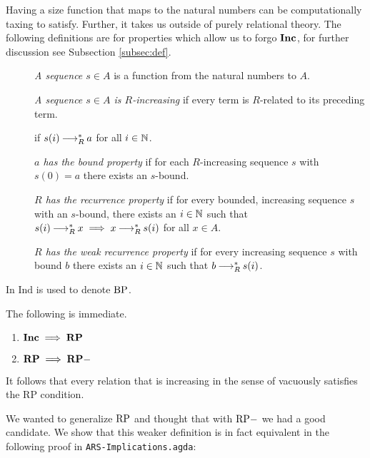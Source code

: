 Having a size function that maps to the natural numbers can be computationally taxing to satisfy.
Further, it takes us outside of purely relational theory. The following definitions are for properties which allow us to forgo $\mathbf{Inc}$, for further discussion see Subsection \ref{subsec:def}.
\begin{definition} \label{def:rp} \hfill
    \begin{description}
        \item[] \emph{A sequence $s \in A$} is a function from the natural numbers to $A$.
        \item[] \emph{A sequence $s \in A$ is $R$-increasing} if every term is $R$-related to its preceding term.
        \item[] if $s (i) \mathbin{\longrightarrow_R^*} a$ for all $i \in \mathbb{N}$.
        \item[] \emph{$a$ has the bound property} if for each $R$-increasing sequence $s$ with $s (0) = a$ there exists an $s$-bound.
        \item[] \emph{$R$ has the recurrence property} if for every bounded, increasing sequence $s$ with an $s$-bound, there exists an $i \in \mathbb{N}$ such that
        $s (i) \mathbin{\longrightarrow_R^*} x \implies x \mathbin{\longrightarrow_R^*} s (i)$ for all $x\in A$. 
        \item[] \emph{$R$ has the weak recurrence property} if for every increasing sequence $s$ with bound $b$ there exists an $i \in \mathbb{N}$ such that $b \mathbin{\longrightarrow_R^*} s (i)$.
    \end{description}
\end{definition}

In \terese $\mathrm{Ind}$ is used to denote $\mathrm{BP}$.

The following is immediate.
\begin{proposition}\hfill
    \begin{enumerate}
        \item $\mathbf{Inc} \implies \mathbf{RP}$
        \item $\mathbf{RP} \implies \mathbf{RP{-}}$
    \end{enumerate}
\end{proposition}


It follows that every relation that is increasing in the sense of \terese
vacuously satisfies the RP condition.

We wanted to generalize $\mathrm{RP}$ and thought that with $\mathrm{RP{-}}$ we had a good candidate.
 We show that this weaker definition is
in fact equivalent in the following proof in \texttt{ARS-Implications.agda}:

